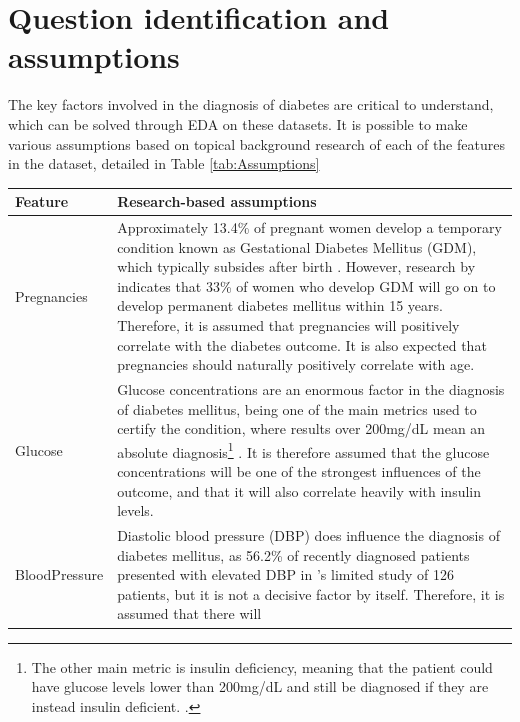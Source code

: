 \documentclass[12pt]{report}
\begin{document}
\pagebreak 

\section{Question identification and assumptions}
The key factors involved in the diagnosis of diabetes are critical to understand, which 
can be solved through EDA on these datasets. It is possible to make various assumptions based 
on topical background research of each of the features in the dataset, detailed in Table \ref{tab:Assumptions}

\begin{longtable}{ | p{} | p{} | }
    \hline
    \cellcolor{blue!25} Feature & \cellcolor{blue!25} Research-based assumptions \\
    \hline
    Pregnancies & Approximately 13.4\% of pregnant women develop a temporary condition known as Gestational 
    Diabetes Mellitus (GDM), which typically subsides after birth \autocite{adam_pregnancy_2023}.
    However, research by \autocite{dennison_absolute_2021} indicates that 33\% of women who develop 
    GDM will go on to develop permanent diabetes mellitus within 15 years. Therefore, it is assumed 
    that pregnancies will positively correlate with the diabetes outcome. It is also expected that 
    pregnancies should naturally positively correlate with age. \\
    \hline
    Glucose & Glucose concentrations are an enormous factor in the diagnosis of diabetes mellitus, being one 
    of the main metrics used to certify the condition, where results over 200mg/dL mean an absolute diagnosis\footnote{The other main metric is insulin deficiency, meaning that the patient could have glucose levels lower than 200mg/dL and still be diagnosed if they are instead insulin deficient. \autocite{aftab_cloud-based_2021}.}
    \autocite{aftab_cloud-based_2021}. It is therefore assumed that the glucose concentrations will be one 
    of the strongest influences of the outcome, and that it will also correlate heavily with insulin levels. \\
    \hline
    BloodPressure & Diastolic blood pressure (DBP) does influence the diagnosis of diabetes mellitus, as 
    56.2\% of recently diagnosed patients presented with elevated DBP in \textcite{nelaj_high_2023}'s limited 
    study of 126 patients, but it is not a decisive factor by itself. Therefore, it is assumed that there will 

\end{longtable}
\end{document}
